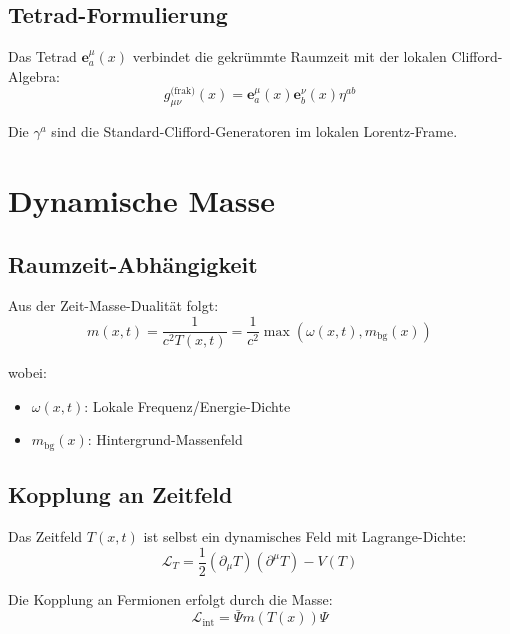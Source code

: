	\subsection{Tetrad-Formulierung}
	
	Das Tetrad $\mathbf{e}^\mu_a(x)$ verbindet die gekrümmte Raumzeit mit der lokalen 
	Clifford-Algebra:
	\begin{equation}
		g_{\mu\nu}^{\text{(frak)}}(x) = \mathbf{e}^\mu_a(x) \mathbf{e}^\nu_b(x) \eta^{ab}
		\label{eq:tetrad_metric}
	\end{equation}
	
	Die $\gamma^a$ sind die Standard-Clifford-Generatoren im lokalen Lorentz-Frame.
	
	\section{Dynamische Masse}
	
	\subsection{Raumzeit-Abhängigkeit}
	
	Aus der Zeit-Masse-Dualität folgt:
	\begin{equation}
		m(x,t) = \frac{1}{c^2 T(x,t)} = \frac{1}{c^2} \max(\omega(x,t), m_{\text{bg}}(x))
		\label{eq:dynamic_mass}
	\end{equation}
	
	wobei:
	\begin{itemize}
		\item $\omega(x,t)$: Lokale Frequenz/Energie-Dichte
		\item $m_{\text{bg}}(x)$: Hintergrund-Massenfeld
	\end{itemize}
	
	\subsection{Kopplung an Zeitfeld}
	
	Das Zeitfeld $T(x,t)$ ist selbst ein dynamisches Feld mit Lagrange-Dichte:
	\begin{equation}
		\mathcal{L}_T = \frac{1}{2}(\partial_\mu T)(\partial^\mu T) - V(T)
		\label{eq:time_lagrangian}
	\end{equation}
	
	Die Kopplung an Fermionen erfolgt durch die Masse:
	\begin{equation}
		\mathcal{L}_{\text{int}} = \bar{\Psi} m(T(x)) \Psi
		\label{eq:fermion_time_coupling}
	\end{equation}
	
